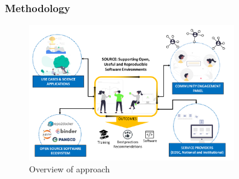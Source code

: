 \subsubsection{Methodology}\label{sec:methodology}

\begin{figure}[htb]
  \includegraphics[width=0.80\textwidth]{images/approach.png}
  \caption{Overview of \TheProject approach} \label{fig:overview-approach}
\end{figure}

